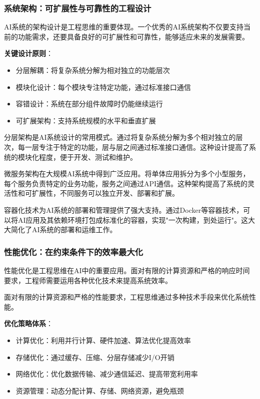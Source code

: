 \subsubsection{系统架构：可扩展性与可靠性的工程设计}

AI系统的架构设计是工程思维的重要体现。一个优秀的AI系统架构不仅要支持当前的功能需求，还要具备良好的可扩展性和可靠性，能够适应未来的发展需要。


\textbf{关键设计原则}：
\begin{itemize}
\item 分层解耦：将复杂系统分解为相对独立的功能层次
\item 模块化设计：每个模块专注特定功能，通过标准接口通信
\item 容错设计：系统在部分组件故障时仍能继续运行
\item 可扩展架构：支持系统规模的水平和垂直扩展
\end{itemize}

分层架构是AI系统设计的常用模式。通过将复杂系统分解为多个相对独立的层次，每一层专注于特定的功能，层与层之间通过标准接口通信。这种设计提高了系统的模块化程度，便于开发、测试和维护。

微服务架构在大规模AI系统中得到广泛应用。将单体应用拆分为多个小型服务，每个服务负责特定的业务功能，服务之间通过API通信。这种架构提高了系统的灵活性和可扩展性，不同服务可以独立开发、部署和扩展。

容器化技术为AI系统的部署和管理提供了强大支持。通过Docker等容器技术，可以将AI应用及其依赖环境打包成标准化的容器，实现"一次构建，到处运行"。这大大简化了AI系统的部署和运维工作。

\subsubsection{性能优化：在约束条件下的效率最大化}

性能优化是工程思维在AI中的重要应用。面对有限的计算资源和严格的响应时间要求，工程师需要运用各种优化技术来提高系统效率。

面对有限的计算资源和严格的性能要求，工程思维通过多种技术手段来优化系统性能。

\textbf{优化策略体系}：
\begin{itemize}
\item 计算优化：利用并行计算、硬件加速、算法优化提高效率
\item 存储优化：通过缓存、压缩、分层存储减少I/O开销
\item 网络优化：优化数据传输、减少通信延迟、提高带宽利用率
\item 资源管理：动态分配计算、存储、网络资源，避免瓶颈
\end{itemize}


